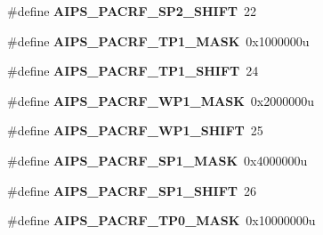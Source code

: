 \begin{DoxyCompactItemize}
\item 
\#define {\bfseries A\+I\+P\+S\+\_\+\+P\+A\+C\+R\+F\+\_\+\+S\+P2\+\_\+\+S\+H\+I\+FT}~22\hypertarget{group__AIPS__Register__Masks_gad42b1d7f0c64c25514f04f84507e1a0e}{}\label{group__AIPS__Register__Masks_gad42b1d7f0c64c25514f04f84507e1a0e}

\item 
\#define {\bfseries A\+I\+P\+S\+\_\+\+P\+A\+C\+R\+F\+\_\+\+T\+P1\+\_\+\+M\+A\+SK}~0x1000000u\hypertarget{group__AIPS__Register__Masks_ga47e7b3e22494a83ba6942d54ed7d1835}{}\label{group__AIPS__Register__Masks_ga47e7b3e22494a83ba6942d54ed7d1835}

\item 
\#define {\bfseries A\+I\+P\+S\+\_\+\+P\+A\+C\+R\+F\+\_\+\+T\+P1\+\_\+\+S\+H\+I\+FT}~24\hypertarget{group__AIPS__Register__Masks_gadad146252c4d20d73f2603366b5ebd58}{}\label{group__AIPS__Register__Masks_gadad146252c4d20d73f2603366b5ebd58}

\item 
\#define {\bfseries A\+I\+P\+S\+\_\+\+P\+A\+C\+R\+F\+\_\+\+W\+P1\+\_\+\+M\+A\+SK}~0x2000000u\hypertarget{group__AIPS__Register__Masks_ga02da010889ce203dd0750604ca9cd428}{}\label{group__AIPS__Register__Masks_ga02da010889ce203dd0750604ca9cd428}

\item 
\#define {\bfseries A\+I\+P\+S\+\_\+\+P\+A\+C\+R\+F\+\_\+\+W\+P1\+\_\+\+S\+H\+I\+FT}~25\hypertarget{group__AIPS__Register__Masks_gafb837c25b68ce7a946e445b28abd3456}{}\label{group__AIPS__Register__Masks_gafb837c25b68ce7a946e445b28abd3456}

\item 
\#define {\bfseries A\+I\+P\+S\+\_\+\+P\+A\+C\+R\+F\+\_\+\+S\+P1\+\_\+\+M\+A\+SK}~0x4000000u\hypertarget{group__AIPS__Register__Masks_gaf2e1b7d278d5b80aa9eb53c725050e6e}{}\label{group__AIPS__Register__Masks_gaf2e1b7d278d5b80aa9eb53c725050e6e}

\item 
\#define {\bfseries A\+I\+P\+S\+\_\+\+P\+A\+C\+R\+F\+\_\+\+S\+P1\+\_\+\+S\+H\+I\+FT}~26\hypertarget{group__AIPS__Register__Masks_gae4c490d4d315696d08ddb17129673f09}{}\label{group__AIPS__Register__Masks_gae4c490d4d315696d08ddb17129673f09}

\item 
\#define {\bfseries A\+I\+P\+S\+\_\+\+P\+A\+C\+R\+F\+\_\+\+T\+P0\+\_\+\+M\+A\+SK}~0x10000000u\hypertarget{group__AIPS__Register__Masks_ga29803aa48ee5f63ae66a7d8caae448cb}{}\label{group__AIPS__Register__Masks_ga29803aa48ee5f63ae66a7d8caae448cb}


\end{DoxyCompactItemize}
